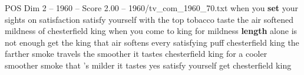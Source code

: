 \begin{textsample}{POS Dim 2 – 1960 – Score 2.00 – 1960/tv\_com\_1960\_70.txt}  \label{ex:f2_pos_029}
when you \textbf{set} your sights on satisfaction satisfy yourself with the top tobacco taste the air softened mildness of chesterfield king when you come to king for mildness \textbf{length} alone is not enough get the king that air softens every satisfying puff chesterfield king the farther smoke travels the smoother it tastes chesterfield king for a cooler smoother smoke that 's milder it tastes yes satisfy yourself get chesterfield king

\end{textsample}

